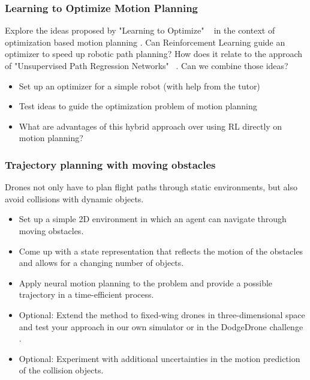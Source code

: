 \documentclass[a4paper]{article}
\begin{document}
\subsubsection{Learning to Optimize Motion Planning}
Explore the ideas proposed by "Learning to Optimize" ~\cite{LiM16b} in the context of optimization based motion planning \cite{Zucker2013}.
Can Reinforcement Learning guide an optimizer to speed up robotic path planning?
How does it relate to the approach of "Unsupervised Path Regression Networks" ~\cite{Pandy2020}.
Can we combine those ideas?

\begin{itemize}
  \item Set up an optimizer for a simple robot (with help from the tutor)
  \item Test ideas to guide the optimization problem of motion planning
  \item What are advantages of this hybrid approach over using RL directly on motion planning?
\end{itemize}

\subsubsection{Trajectory planning with moving obstacles}
Drones not only have to plan flight paths through static environments, but also avoid collisions with dynamic objects.
\begin{itemize}
  \item Set up a simple 2D environment in which an agent can navigate through moving obstacles.
  \item Come up with a state representation that reflects the motion of the obstacles and allows for a changing number of objects.
  \item Apply neural motion planning to the problem and provide a possible trajectory in a time-efficient process.
  \item Optional: Extend the method to fixed-wing drones in three-dimensional space and test your approach in our own simulator \cite{BionicVTOL} or in the DodgeDrone challenge \cite{DodgeDroneChallenge}.
  \item Optional: Experiment with additional uncertainties in the motion prediction of the collision objects.
\end{itemize}
\end{document}
